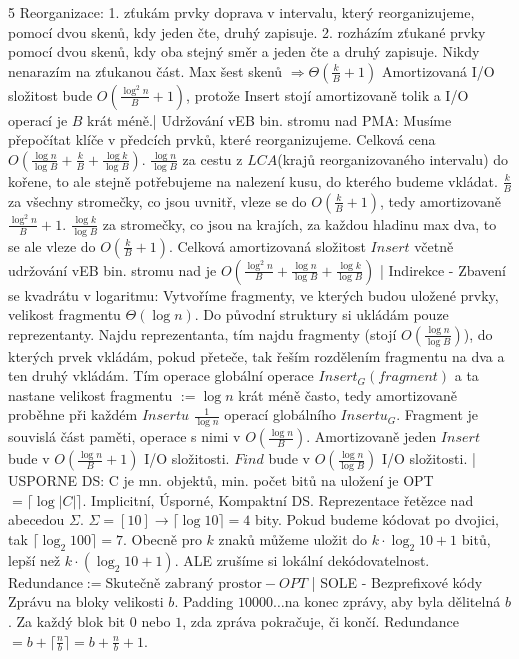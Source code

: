 \documentclass[8pt]{extarticle}
\begin{document}
\begin{multicols*}{5}
Reorganizace: 1. zťukám prvky doprava v intervalu, který reorganizujeme, pomocí dvou skenů, kdy jeden čte, druhý zapisuje. 2. rozházím zťukané prvky pomocí dvou skenů, kdy oba stejný směr a jeden čte a druhý zapisuje. Nikdy nenarazím na zťukanou část. Max šest skenů $\Rightarrow \Theta(\frac{k}{B} + 1)$ Amortizovaná I/O složitost bude $O(\frac{\log^2 n}{B} +1)$, protože Insert stojí amortizovaně tolik a I/O operací je $B$ krát méně.| Udržování vEB bin. stromu nad PMA: Musíme přepočítat klíče v předcích prvků, které reorganizujeme. Celková cena $O(\frac{\log n}{\log B} + \frac{k}{B} + \frac{\log k}{\log B})$.
$\frac{\log n}{\log B}$ za cestu z $LCA$(krajů reorganizovaného intervalu) do kořene, to ale stejně potřebujeme na nalezení kusu, do kterého budeme vkládat. $\frac{k}{B}$ za všechny stromečky, co jsou uvnitř, vleze se do $O(\frac{k}B +1)$, tedy amortizovaně $\frac{\log^2 n}{B} + 1$. $\frac{\log k}{\log B}$ za stromečky, co jsou na krajích, za každou hladinu max dva, to se ale vleze do $O(\frac{k}{B} + 1)$. Celková amortizovaná složitost $Insert$ včetně udržování vEB bin. stromu nad je $O(\frac{\log^2 n}{B} + \frac{\log n}{\log B} + \frac{\log k}{\log B})$ | Indirekce - Zbavení se kvadrátu v logaritmu: Vytvoříme fragmenty, ve kterých budou uložené prvky, velikost fragmentu $\Theta(\log n)$. Do původní struktury si ukládám pouze reprezentanty. Najdu reprezentanta, tím najdu fragmenty (stojí $O(\frac{\log n}{\log B})$), do kterých prvek vkládám, pokud přeteče, tak řeším rozdělením fragmentu na dva a ten druhý vkládám. Tím operace globální operace $Insert_G(fragment)$ a ta nastane velikost fragmentu $:= \log n$ krát méně často, tedy amortizovaně proběhne při každém $Insertu$ $\frac{1}{\log n}$ operací globálního $Insertu_G$. Fragment je souvislá část paměti, operace s nimi v $O(\frac{\log n}{B})$. Amortizovaně jeden $Insert$ bude v $O(\frac{\log n}{B} + 1)$ I/O složitosti. $Find$ bude v $O(\frac{\log n}{\log B})$ I/O složitosti. | USPORNE DS: C je mn. objektů, min. počet bitů na uložení je OPT $=\lceil{\log|C|}\rceil$. Implicitní, Úsporné, Kompaktní DS. Reprezentace řetězce nad abecedou $\Sigma$. $\Sigma = [10] \rightarrow \lceil\log10\rceil = 4$ bity. Pokud budeme kódovat po dvojici, tak $\lceil\log_2{100}\rceil = 7$. Obecně pro $k$ znaků můžeme uložit do $k \cdot \log_2{10}+1$ bitů, lepší než $k \cdot (\log_2{10}+1)$. ALE zrušíme si lokální dekódovatelnost. $\text{Redundance} := \text{Skutečně zabraný prostor} - OPT$ | SOLE - Bezprefixové kódy  Zprávu na bloky velikosti $b$. Padding $10000\ldots$na konec zprávy, aby byla dělitelná $b$. Za každý blok bit $0$ nebo $1$, zda zpráva pokračuje, či končí. Redundance $= b + \lceil\frac{n}{b}\rceil = b + \frac{n}{b} + 1$.

\end{multicols*}
\end{document}
